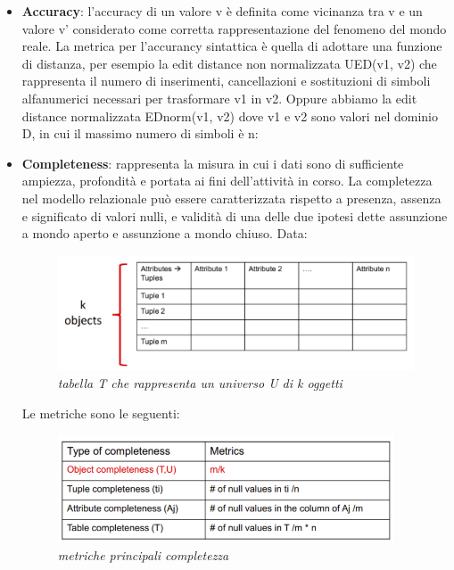 \documentclass[a4paper,12pt]{article}
\begin{document}
\begin{itemize}
\item \textbf{Accuracy}: l'accuracy di un valore v è definita come vicinanza tra v e un valore v' considerato come corretta rappresentazione del fenomeno del mondo reale. La metrica per l'accurancy sintattica è quella di adottare una funzione di distanza, per esempio la edit distance non normalizzata UED(v1, v2) che rappresenta il numero di inserimenti, cancellazioni e sostituzioni di simboli alfanumerici necessari per trasformare v1 in v2. Oppure abbiamo la edit distance normalizzata EDnorm(v1, v2) dove v1 e v2 sono valori nel dominio D, in cui il massimo numero di simboli è n:

\begin{center}
\end{center}

\item \textbf{Completeness}: rappresenta la misura in cui i dati sono di sufficiente ampiezza, profondità e portata ai fini dell'attività in corso. La completezza nel modello relazionale può essere caratterizzata rispetto a presenza, assenza e significato di valori nulli, e validità di una delle due ipotesi dette assunzione a mondo aperto e assunzione a mondo chiuso. Data:
\begin{figure}[H]
	\centering
	\includegraphics[width=0.8\linewidth]{img/table.png}
	\caption{\textit{tabella T che rappresenta un universo U di k oggetti }}
\end{figure}

Le metriche sono le seguenti:
\begin{figure}[H]
	\centering
	\includegraphics[width=0.8\linewidth]{img/metricheCompletezza.png}
	\caption{\textit{metriche principali completezza}}
\end{figure}


\end{itemize}
\end{document}
